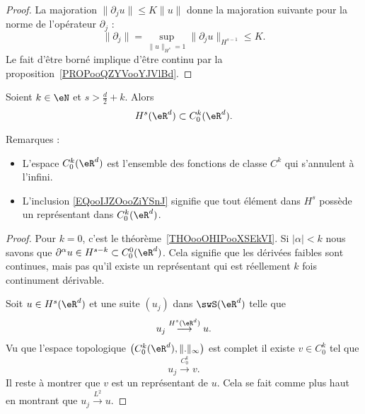 \begin{proof}
	La majoration \( \| \partial_ju \|\leq K\| u \|\) donne la majoration suivante pour la norme de l'opérateur \( \partial_j\) :
	\begin{equation}
		\| \partial_j \|=\sup_{\| u \|_{H^s}=1}\| \partial_ju \|_{H^{s-1}}\leq K.
	\end{equation}
	Le fait d'être borné implique d'être continu par la proposition~\ref{PROPooQZYVooYJVlBd}.
\end{proof}

\begin{theorem}
	Soient \( k\in \eN\) et \( s>\frac{ d }{ 2 }+k\). Alors
	\begin{equation}        \label{EQooIJZOooZiYSnJ}
		H^s(\eR^d)\subset C_0^k(\eR^d).
	\end{equation}
\end{theorem}

Remarques :
\begin{itemize}
	\item
	      L'espace \( C_0^k(\eR^d)\) est l'ensemble des fonctions de classe \( C^k\) qui s'annulent à l'infini.
	\item
	      L'inclusion \eqref{EQooIJZOooZiYSnJ} signifie que tout élément dans \( H^s\) possède un représentant dans \( C_0^k(\eR^d)\).
\end{itemize}

\begin{proof}
	Pour \( k=0\), c'est le théorème~\ref{THOooOHIPooXSEkVI}. Si \( | \alpha |<k\) nous savons que \( \partial^{\alpha}u\in H^{s-k}\subset C_0^0(\eR^d) \). Cela signifie que les dérivées faibles sont continues, mais pas qu'il existe un représentant qui est réellement \( k\) fois continument dérivable.

	Soit \( u\in H^s(\eR^d)\) et une suite \( (u_j)  \) dans \( \swS(\eR^d)\) telle que
	\begin{equation}
		u_j\stackrel{H^s(\eR^d)}{\longrightarrow}u.
	\end{equation}
	Vu que l'espace topologique \( \big( C_0^k(\eR^d),\| . \|_{\infty} \big)\) est complet il existe \( v\in C_0^k\) tel que
	\begin{equation}
		u_j\stackrel{C_0^k}{\longrightarrow}v.
	\end{equation}
	Il reste à montrer que \( v\) est un représentant de \( u\). Cela se fait comme plus haut en montrant que \( u_j\stackrel{L^2}{\longrightarrow}u\).
\end{proof}
